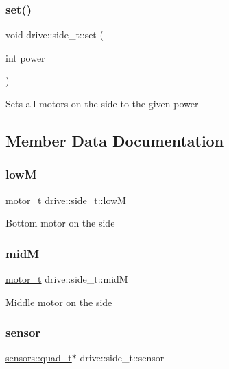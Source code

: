 \subsubsection{\texorpdfstring{set()}{set()}}
{\footnotesize\ttfamily void drive\+::side\+\_\+t\+::set (\begin{DoxyParamCaption}\item[{int}]{power }\end{DoxyParamCaption})}

Sets all motors on the side to the given power 

\subsection{Member Data Documentation}
\mbox{\label{structdrive_1_1side__t_a38de3f1053b41c5b2824ffed7ab8c32a}} 
\subsubsection{\texorpdfstring{lowM}{lowM}}
{\footnotesize\ttfamily \hyperlink{structmotor__t}{motor\+\_\+t} drive\+::side\+\_\+t\+::lowM}

Bottom motor on the side \mbox{\label{structdrive_1_1side__t_acb33aa4a812f555b5fa0e94882d6e91a}} 
\subsubsection{\texorpdfstring{midM}{midM}}
{\footnotesize\ttfamily \hyperlink{structmotor__t}{motor\+\_\+t} drive\+::side\+\_\+t\+::midM}

Middle motor on the side \mbox{\label{structdrive_1_1side__t_a50f80a71f0be44bbb8df9b7f3f81aedf}} 
\subsubsection{\texorpdfstring{sensor}{sensor}}
{\footnotesize\ttfamily \hyperlink{structsensors_1_1quad__t}{sensors\+::quad\+\_\+t}$\ast$ drive\+::side\+\_\+t\+::sensor}

